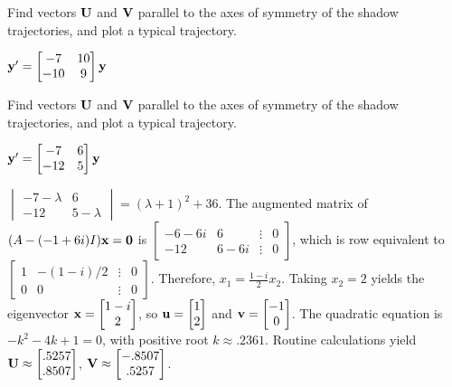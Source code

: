 \documentclass{ximera}
\begin{document}
 \begin{problem}\label{exer:10.6.39}  
 Find vectors
${\bf U}$ and ${\bf V}$ parallel to the axes of symmetry of the shadow
trajectories, and plot a typical trajectory.

$ {\bf y}'= \begin{bmatrix}-7&10\\-10&9\end{bmatrix}{\bf y}$
 \end{problem}

 \begin{problem}\label{exer:10.6.40}  
 Find vectors
${\bf U}$ and ${\bf V}$ parallel to the axes of symmetry of the shadow
trajectories, and plot a typical trajectory.

$ {\bf y}'= \begin{bmatrix}-7&6\\-12&5\end{bmatrix}{\bf y}$

\begin{solution}
    $\begin{vmatrix}-7-\lambda&6\\-12&5-\lambda
\end{vmatrix}=(\lambda+1)^2+36$.
The augmented matrix of $(A-(-1+6i)I){\bf x}={\bf 0}$ is
$ \begin{bmatrix}-6-6i&6&\vdots&0\\
-12&6-6i&\vdots&0  \end{bmatrix}$,
which is row equivalent to
$ \begin{bmatrix} 1&-(1-i)/2&\vdots&0\\ 0&0&\vdots&0
 \end{bmatrix}$.
Therefore, $x_1=\frac{1-i }{2}x_2$. Taking $x_2=2$
yields the eigenvector
 ${\bf x}= \begin{bmatrix}1-i\\2 \end{bmatrix}$,
so ${\bf u}=  \begin{bmatrix}1\\2\end{bmatrix}$ and ${\bf v}=  \begin{bmatrix}-1\\0\end{bmatrix}$.
The quadratic equation is $-k^2-4k+1=0$, with positive root
$k\approx.2361$.
 Routine calculations yield
 ${\bf U}\approx  \begin{bmatrix}.5257\\.8507\end{bmatrix}$,
${\bf V}\approx  \begin{bmatrix}-.8507\\.5257\end{bmatrix}$.
\end{solution}
 \end{problem}
 
\end{document}
